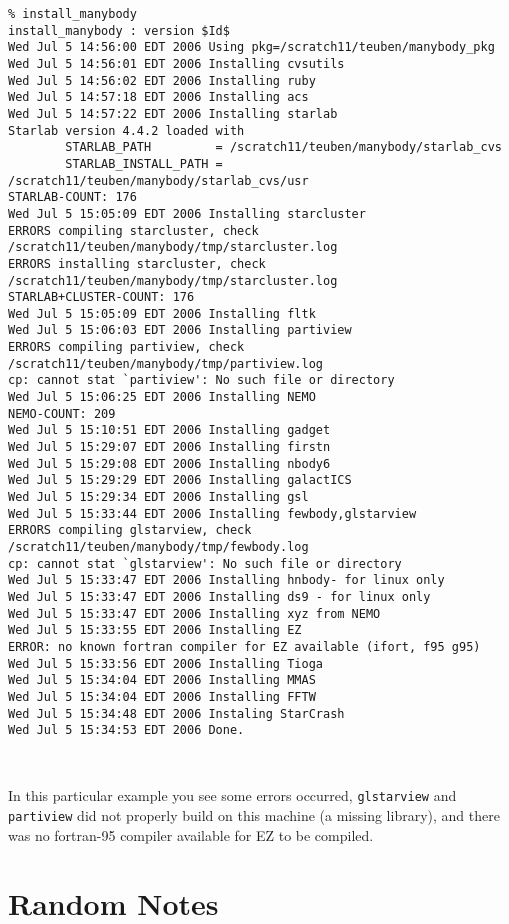 \begin{itemize}
\begin{itemize}
\footnotesize\begin{verbatim}
% install_manybody
install_manybody : version $Id$
Wed Jul 5 14:56:00 EDT 2006 Using pkg=/scratch11/teuben/manybody_pkg
Wed Jul 5 14:56:01 EDT 2006 Installing cvsutils
Wed Jul 5 14:56:02 EDT 2006 Installing ruby
Wed Jul 5 14:57:18 EDT 2006 Installing acs
Wed Jul 5 14:57:22 EDT 2006 Installing starlab
Starlab version 4.4.2 loaded with
        STARLAB_PATH         = /scratch11/teuben/manybody/starlab_cvs
        STARLAB_INSTALL_PATH = /scratch11/teuben/manybody/starlab_cvs/usr
STARLAB-COUNT: 176
Wed Jul 5 15:05:09 EDT 2006 Installing starcluster
ERRORS compiling starcluster, check /scratch11/teuben/manybody/tmp/starcluster.log
ERRORS installing starcluster, check /scratch11/teuben/manybody/tmp/starcluster.log
STARLAB+CLUSTER-COUNT: 176
Wed Jul 5 15:05:09 EDT 2006 Installing fltk
Wed Jul 5 15:06:03 EDT 2006 Installing partiview
ERRORS compiling partiview, check /scratch11/teuben/manybody/tmp/partiview.log
cp: cannot stat `partiview': No such file or directory
Wed Jul 5 15:06:25 EDT 2006 Installing NEMO
NEMO-COUNT: 209
Wed Jul 5 15:10:51 EDT 2006 Installing gadget
Wed Jul 5 15:29:07 EDT 2006 Installing firstn
Wed Jul 5 15:29:08 EDT 2006 Installing nbody6
Wed Jul 5 15:29:29 EDT 2006 Installing galactICS
Wed Jul 5 15:29:34 EDT 2006 Installing gsl
Wed Jul 5 15:33:44 EDT 2006 Installing fewbody,glstarview
ERRORS compiling glstarview, check /scratch11/teuben/manybody/tmp/fewbody.log
cp: cannot stat `glstarview': No such file or directory
Wed Jul 5 15:33:47 EDT 2006 Installing hnbody- for linux only
Wed Jul 5 15:33:47 EDT 2006 Installing ds9 - for linux only
Wed Jul 5 15:33:47 EDT 2006 Installing xyz from NEMO
Wed Jul 5 15:33:55 EDT 2006 Installing EZ
ERROR: no known fortran compiler for EZ available (ifort, f95 g95)
Wed Jul 5 15:33:56 EDT 2006 Installing Tioga
Wed Jul 5 15:34:04 EDT 2006 Installing MMAS
Wed Jul 5 15:34:04 EDT 2006 Installing FFTW
Wed Jul 5 15:34:48 EDT 2006 Instaling StarCrash
Wed Jul 5 15:34:53 EDT 2006 Done.



\end{verbatim}\normalsize

In this particular example you see some errors occurred, {\tt glstarview} and
{\tt partiview} did not
properly build on this machine (a missing library), and there was no fortran-95
compiler available for EZ to be compiled.

\section{Random Notes}


\end{itemize}
\end{itemize}
